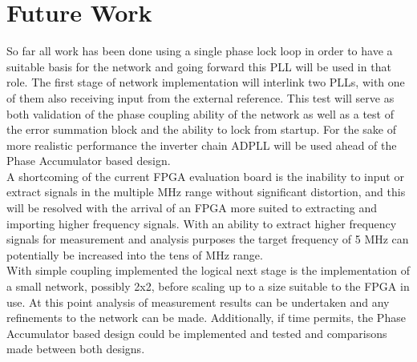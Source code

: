 \documentclass[11pt,english,british]{report}
\begin{document}
\chapter{Future Work}
So far all work has been done using a single phase lock loop in order to have a suitable basis for the network and going forward this PLL will be used in that role. The first stage of network implementation will interlink two PLLs, with one of them also receiving input from the external reference. This test will serve as both validation of the phase coupling ability of the network as well as a test of the error summation block and the ability to lock from startup. For the sake of more realistic performance the inverter chain ADPLL will be used ahead of the Phase Accumulator based design.\\
A shortcoming of the current FPGA evaluation board is the inability to input or extract signals in the multiple MHz range without significant distortion, and this will be resolved with the arrival of an FPGA more suited to extracting and importing higher frequency signals. With an ability to extract higher frequency signals for measurement and analysis purposes the target frequency of 5 MHz can potentially be increased into the tens of MHz range.\\
With simple coupling implemented the logical next stage is the implementation of a small network, possibly 2x2, before scaling up to a size suitable to the FPGA in use. At this point analysis of measurement results can be undertaken and any refinements to the network can be made. Additionally, if time permits, the Phase Accumulator based design could be implemented and tested and comparisons made between both designs.

\newpage
 

\end{document}
